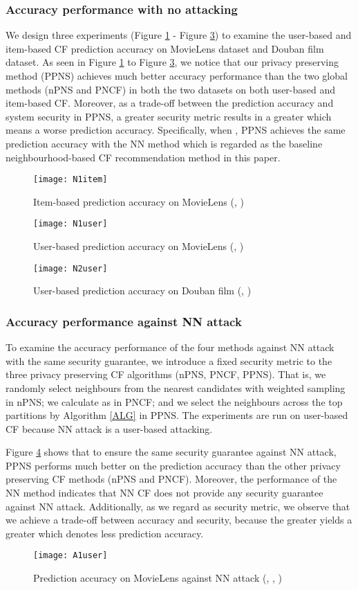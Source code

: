 \documentclass[11pt]{article}
\begin{document}
\subsubsection{Accuracy performance with no attacking}
We design three experiments (Figure \ref{fig:N1item} - Figure \ref{fig:N2user}) to examine the user-based and item-based CF prediction accuracy on MovieLens dataset and Douban film dataset. As seen in Figure \ref{fig:N1item} to Figure \ref{fig:N2user}, we notice that our privacy preserving method (PPNS) achieves much better accuracy performance than the two global methods (nPNS and PNCF) in both the two datasets on both user-based and item-based CF. Moreover, as a trade-off between the prediction accuracy and system security in PPNS, a greater security metric  results in a greater  which means a worse prediction accuracy. Specifically, when , PPNS achieves the same prediction accuracy with the NN method which is regarded as the baseline neighbourhood-based CF recommendation method in this paper.
\begin{figure}[!h]
\centering
\texttt{[image: N1item]}
\caption{Item-based prediction accuracy on MovieLens (, )}
\label{fig:N1item}
\end{figure}
\begin{figure}[!h]
\centering
\texttt{[image: N1user]}
\caption{User-based prediction accuracy on MovieLens (, )}
\label{fig:N1user}
\end{figure}
\begin{figure}[!h]
\centering
\texttt{[image: N2user]}
\caption{User-based prediction accuracy on Douban film (, )}
\label{fig:N2user}
\end{figure}


\subsubsection{Accuracy performance against NN attack}
To examine the accuracy performance of the four methods against NN attack with the same security guarantee, we introduce a fixed security metric  to the three privacy preserving CF algorithms (nPNS, PNCF, PPNS). That is, we randomly select  neighbours from the  nearest candidates with weighted sampling in nPNS; we calculate  as  in PNCF; and we select the  neighbours across the top  partitions by Algorithm \ref{ALG} in PPNS. The experiments are run on user-based CF because NN attack is a user-based attacking.

Figure \ref{fig:A1user} shows that to ensure the same security guarantee against NN attack, PPNS performs much better on the prediction accuracy than the other privacy preserving CF methods (nPNS and PNCF). Moreover, the  performance of the NN method indicates that NN CF does not provide any security guarantee against NN attack. Additionally, as we regard  as security metric, we observe that we achieve a trade-off between accuracy and security, because the greater  yields a greater  which denotes less prediction accuracy.
\begin{figure}[!h]
\centering
\texttt{[image: A1user]}
\caption{Prediction accuracy on MovieLens against NN attack (, , )}
\label{fig:A1user}
\end{figure}
\end{document}
